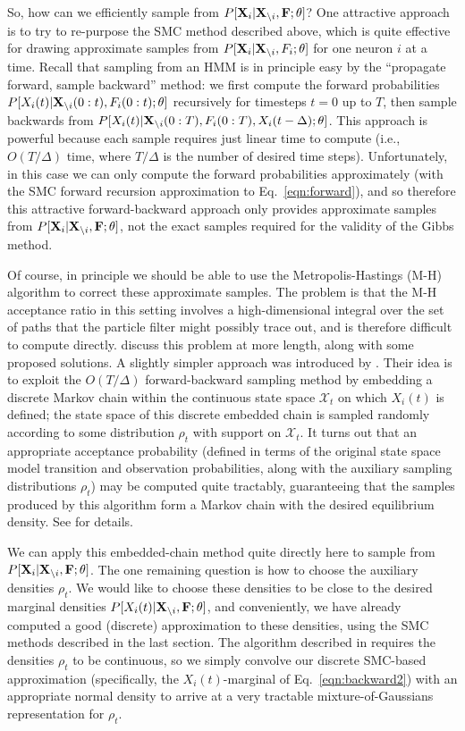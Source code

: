 \documentclass[aoas,preprint]{imsart}
\renewcommand{\i}{\backslash i}
\newcommand{\bth}{\mathbf{\theta}}
\newcommand{\bF}{{\bf F}}
\newcommand{\bX}{{\bf X}}
\begin{document}
So, how can we efficiently sample from $P[\bX_i | \bX_{\i}, \bF;
\bth]$? One attractive approach is to try to re-purpose the SMC method
described above, which is quite effective for drawing approximate
samples from $P[\bX_i | \bX_{\i}, F_i; \bth]$ for one neuron $i$ at
a time. Recall that sampling from an HMM is in principle easy by the
``propagate forward, sample backward'' method: we first compute the
forward probabilities $P[X_i(t) | \bX_{\i}(0:t), F_i(0:t); \bth]$
recursively for timesteps $t=0$ up to $T$, then sample backwards from
$P[X_i(t) | \bX_{\i}(0:T), F_i(0:T), X_i(t-\Delta); \bth]$. This
approach is powerful because each sample requires just linear time to
compute (i.e., $O(T/\Delta)$ time, where $T/\Delta$ is the number of
desired time steps). Unfortunately, in this case we can only compute
the forward probabilities approximately (with the SMC forward
recursion approximation to Eq.~\eqref{eqn:forward}), and so therefore
this attractive forward-backward approach only provides approximate
samples from $P[\bX_i | \bX_{\i}, \bF; \bth]$, not the exact samples
required for the validity of the Gibbs method.

Of course, in principle we should be able to use the
Metropolis-Hastings (M-H) algorithm to correct these approximate
samples. The problem is that the M-H acceptance ratio in this setting
involves a high-dimensional integral over the set of paths that the
particle filter might possibly trace out, and is therefore difficult
to compute directly. \cite{Andrieu2007} discuss this problem at more
length, along with some proposed solutions. A slightly simpler
approach was introduced by \cite{NBR03}. Their idea is to exploit the
$O(T/\Delta)$ forward-backward sampling method by embedding a discrete
Markov chain within the continuous state space $\mathcal{X}_t$ on
which $X_i(t)$ is defined; the state space of this discrete embedded
chain is sampled randomly according to some distribution $\rho_t$ with
support on $\mathcal{X}_t$. It turns out that an appropriate
acceptance probability (defined in terms of the original state space
model transition and observation probabilities, along with the
auxiliary sampling distributions $\rho_t$) may be computed quite
tractably, guaranteeing that the samples produced by this algorithm
form a Markov chain with the desired equilibrium density. See
\cite{NBR03} for details.

We can apply this embedded-chain method quite directly here to sample
from $P[\bX_i | \bX_{\i}, \bF; \bth]$. The one remaining question is
how to choose the auxiliary densities $\rho_t$. We would like to
choose these densities to be close to the desired marginal densities
$P[X_i(t) | \bX_{\i}, \bF; \bth]$, and conveniently, we have already
computed a good (discrete) approximation to these densities, using the
SMC methods described in the last section. The algorithm described in
\cite{NBR03} requires the densities $\rho_t$ to be continuous, so we
simply convolve our discrete SMC-based approximation (specifically,
the $X_i(t)$-marginal of Eq.~\eqref{eqn:backward2}) with an
appropriate normal density to arrive at a very tractable
mixture-of-Gaussians representation for $\rho_t$.
\end{document}
